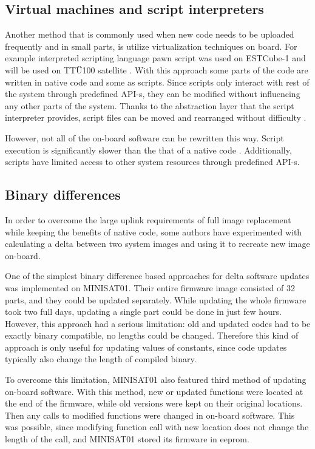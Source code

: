 \subsection{Virtual machines and script interpreters}

Another method that is commonly used when new code needs to be uploaded frequently and in small parts, is utilize virtualization techniques on board. For example interpreted scripting language pawn script was used on ESTCube-1 \cite{Suenter2016} and will be used on TTÜ100 satellite \cite{Aasavaeli2017}. With this approach some parts of the code are written in native code and some as scripts. Since scripts only interact with rest of the system through predefined API-s, they can be modified without influencing any other parts of the system. Thanks to the abstraction layer that the script interpreter provides, script files can be moved and rearranged without difficulty \cite{Riemersm}.

However, not all of the on-board software can be rewritten this way. Script execution is significantly slower than the that of a native code . Additionally, scripts have limited access to other system resources through predefined API-s.


\subsection{Binary differences}

In order to overcome the large uplink requirements of full image replacement while keeping the benefits of native code, some authors have experimented with calculating a delta between two system images and using it to recreate new image on-board.

One of the simplest binary difference based approaches for delta software updates was implemented on MINISAT01. Their entire firmware image consisted of 32 parts, and they could be updated separately. While updating the whole firmware took two full days, updating a single part could be done in just few hours. However, this approach had a serious limitation: old and updated codes had to be exactly binary compatible, no lengths could be changed. Therefore this kind of approach is only useful for updating values of constants, since code updates typically also change the length of compiled binary. \cite{Garrido1998}

To overcome this limitation, MINISAT01 also featured third method of updating on-board software. With this method, new or updated functions were located at the end of the firmware, while old versions were kept on their original locations. Then any calls to modified functions were changed in on-board software. This was possible, since modifying function call with new location does not change the length of the call, and MINISAT01 stored its firmware in \gls{eeprom}. \cite{Garrido1998} 

